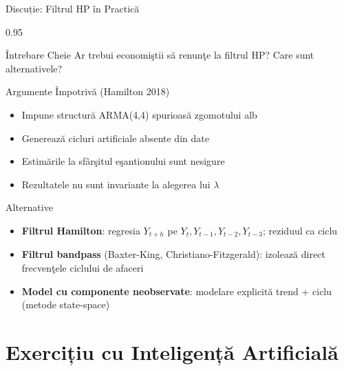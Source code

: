 \documentclass[9pt, aspectratio=169, t]{beamer}
\begin{document}
\begin{frame}{Discuție: Filtrul HP în Practică}
    \begin{cminipage}{0.95\textwidth}
    \vspace{-0.2cm}
    {\small
    \begin{alertblock}{Întrebare Cheie}
        Ar trebui economiştii să renunţe la filtrul HP? Care sunt alternativele?
    \end{alertblock}
    \begin{block}{Argumente Împotrivă (Hamilton 2018)}
        \begin{itemize}\setlength{\itemsep}{0pt}
            \item Impune structură ARMA(4,4) spurioasă zgomotului alb
            \item Generează cicluri artificiale absente din date
            \item Estimările la sfârşitul eşantionului sunt nesigure
            \item Rezultatele nu sunt invariante la alegerea lui $\lambda$
        \end{itemize}
    \end{block}
    \begin{exampleblock}{Alternative}
        \begin{itemize}\setlength{\itemsep}{0pt}
            \item \textbf{Filtrul Hamilton}: regresia $Y_{t+h}$ pe $Y_t, Y_{t-1}, Y_{t-2}, Y_{t-3}$; reziduul ca ciclu
            \item \textbf{Filtrul bandpass} (Baxter-King, Christiano-Fitzgerald): izolează direct frecvenţele ciclului de afaceri
            \item \textbf{Model cu componente neobservate}: modelare explicită trend + ciclu (metode state-space)
        \end{itemize}
    \end{exampleblock}
    }
    \end{cminipage}
\end{frame}

\section{Exercițiu cu Inteligență Artificială}
\end{document}
